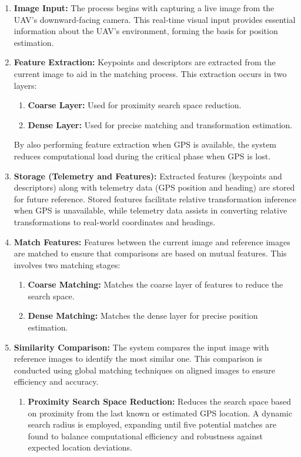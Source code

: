 \begin{enumerate}
    \item \textbf{Image Input:}  
    The process begins with capturing a live image from the UAV’s downward-facing camera. This real-time visual input provides essential information about the UAV’s environment, forming the basis for position estimation.

    \item \textbf{Feature Extraction:}  
    Keypoints and descriptors are extracted from the current image to aid in the matching process. This extraction occurs in two layers:
    \begin{enumerate}
        \item \textbf{Coarse Layer:} Used for proximity search space reduction.
        \item \textbf{Dense Layer:} Used for precise matching and transformation estimation. 
    \end{enumerate}
    By also performing feature extraction when GPS is available, the system reduces computational load during the critical phase when GPS is lost.

    \item \textbf{Storage (Telemetry and Features):}  
    Extracted features (keypoints and descriptors) along with telemetry data (GPS position and heading) are stored for future reference. Stored features facilitate relative transformation inference when GPS is unavailable, while telemetry data assists in converting relative transformations to real-world coordinates and headings.

    \item \textbf{Match Features:}  
    Features between the current image and reference images are matched to ensure that comparisons are based on mutual features. This involves two matching stages:
    \begin{enumerate}
        \item \textbf{Coarse Matching:} Matches the coarse layer of features to reduce the search space.
        \item \textbf{Dense Matching:} Matches the dense layer for precise position estimation.
    \end{enumerate}

    \item \textbf{Similarity Comparison:}  
    The system compares the input image with reference images to identify the most similar one. This comparison is conducted using global matching techniques on aligned images to ensure efficiency and accuracy.
    \begin{enumerate}
        \item \textbf{Proximity Search Space Reduction:}  
        Reduces the search space based on proximity from the last known or estimated GPS location. A dynamic search radius is employed, expanding until five potential matches are found to balance computational efficiency and robustness against expected location deviations.
        

\end{enumerate}
\end{enumerate}
